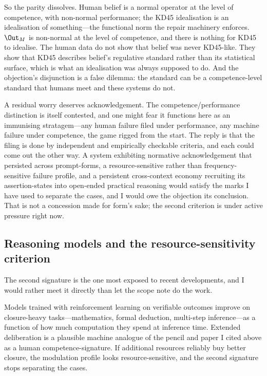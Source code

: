 So the parity dissolves. Human belief is a normal operator at the level of
competence, with non-normal performance; the KD45 idealisation is an idealisation
of something---the functional norm the repair machinery enforces. $\Out_M$ is
non-normal at the level of competence, and there is nothing for KD45 to idealise.
The human data do not show that belief was never KD45-like. They show that KD45
describes belief's regulative standard rather than its statistical surface, which
is what an idealisation was always supposed to do. And the objection's disjunction
is a false dilemma: the standard can be a competence-level standard that humans
meet and these systems do not.

A residual worry deserves acknowledgement. The competence/performance distinction
is itself contested, and one might fear it functions here as an immunising
stratagem---any human failure filed under performance, any machine failure under
competence, the game rigged from the start. The reply is that the filing is done
by independent and empirically checkable criteria, and each could come out the
other way. A system exhibiting normative acknowledgement that persisted across
prompt-forms, a resource-sensitive rather than frequency-sensitive failure
profile, and a persistent cross-context economy recruiting its assertion-states
into open-ended practical reasoning would satisfy the marks I have used to
separate the cases, and I would owe the objection its conclusion. That is not a
concession made for form's sake; the second criterion is under active pressure
right now.

\subsection{Reasoning models and the resource-sensitivity criterion}
\label{sec:reasoning}

The second signature is the one most exposed to recent developments, and I would
rather meet it directly than let the scope note do the work.

Models trained with reinforcement learning on verifiable outcomes improve on
closure-heavy tasks---mathematics, formal deduction, multi-step
inference---as a function of how much computation they spend at inference time.
Extended deliberation is a plausible machine analogue of the pencil and paper I
cited above as a human competence-signature. If additional resources reliably buy
better closure, the modulation profile looks resource-sensitive, and the second
signature stops separating the cases.

